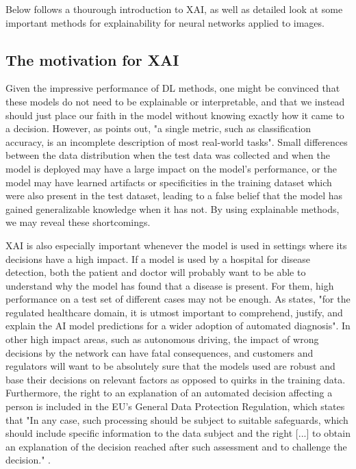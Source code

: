 \documentclass[conference,onecolumn]{IEEEtran}
\begin{document}
Below follows a thourough introduction to XAI, as well as detailed look at some important methods for explainability for neural networks applied to images.

\subsection{The motivation for XAI}

Given the impressive performance of DL methods, one might be convinced that these models do not need to be explainable or interpretable, and that we instead should just place our faith in the model without knowing exactly how it came to a decision. However, as \cite{doshivelez} points out, "a single metric, such as classification accuracy, is an incomplete description of most real-world tasks". Small differences between the data distribution when the test data was collected and when the model is deployed may have a large impact on the model's performance, or the model may have learned artifacts or specificities in the training dataset which were also present in the test dataset, leading to a false belief that the model has gained generalizable knowledge when it has not. By using explainable methods, we may reveal these shortcomings.

XAI is also especially important whenever the model is used in settings where its decisions have a high impact. If a model is used by a hospital for disease detection, both the patient and doctor will probably want to be able to understand why the model has found that a disease is present. For them, high performance on a test set of different cases may not be enough. As \cite{xaisurvey} states, "for the regulated healthcare domain, it is utmost important to comprehend, justify, and explain the AI model predictions for a wider adoption of automated diagnosis". In other high impact areas, such as autonomous driving, the impact of wrong decisions by the network can have fatal consequences, and customers and regulators will want to be absolutely sure that the models used are robust and base their decisions on relevant factors as opposed to quirks in the training data. Furthermore, the right to an explanation of an automated decision affecting a person is included in the EU's General Data Protection Regulation, which states that "In any case, such processing should be subject to suitable safeguards, which should include specific information to the data subject and the right [...] to obtain an explanation of the decision reached after such assessment and to challenge the decision." \cite{gdpr}.
\end{document}
